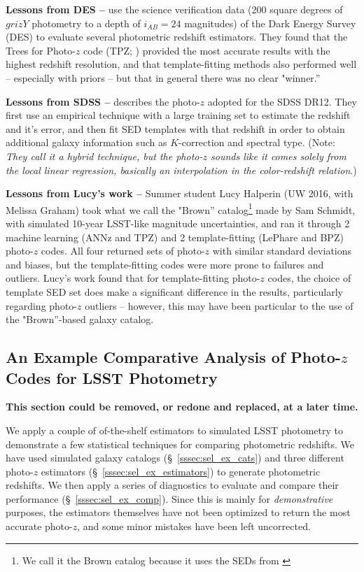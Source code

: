 \documentclass[DM,lsstdraft,toc]{lsstdoc}
\begin{document}
\textbf{Lessons from DES --} \cite{2014MNRAS.445.1482S} use the science verification data (200 square degrees of $grizY$ photometry to a depth of $i_{AB}=24$ magnitudes) of the Dark Energy Survey (DES) to evaluate several photometric redshift estimators. They found that the Trees for Photo-$z$ code (TPZ; \citealt{2013ascl.soft04011C}) provided the most accurate results with the highest redshift resolution, and that template-fitting methods also performed well -- especially with priors -- but that in general there was no clear "winner.''

\textbf{Lessons from SDSS --} \cite{2016MNRAS.460.1371B} describes the photo-$z$ adopted for the SDSS DR12. They first use an empirical technique with a large training set to estimate the redshift and it's error, and then fit SED templates with that redshift in order to obtain additional galaxy information such as $K$-correction and spectral type. (Note: \textit{They call it a hybrid technique, but the photo-$z$ sounds like it comes solely from the local linear regression, basically an interpolation in the color-redshift relation}.)

\textbf{Lessons from Lucy's work --} Summer student Lucy Halperin (UW 2016, with Melissa Graham) took what we call the "Brown'' catalog\footnote{We call it the Brown catalog because it uses the SEDs from \cite{2014ApJS..212...18B}} made by Sam Schmidt, with simulated 10-year LSST-like magnitude uncertainties, and ran it through 2 machine learning (ANNz and TPZ) and 2 template-fitting (LePhare and BPZ) photo-$z$ codes. All four returned sets of photo-$z$ with similar standard deviations and biases, but the template-fitting codes were more prone to failures and outliers. Lucy's work found that for template-fitting photo-$z$ codes, the choice of template SED set does make a significant difference in the results, particularly regarding photo-$z$ outliers -- however, this may have been particular to the use of the "Brown''-based galaxy catalog.


\clearpage
\subsection{An Example Comparative Analysis of Photo-$z$ Codes for LSST Photometry}\label{ssec:sel_ex}

{\bf This section could be removed, or redone and replaced, at a later time.}

We apply a couple of of-the-shelf estimators to simulated LSST photometry to demonstrate a few statistical techniques for comparing photometric redshifts.
We have used simulated galaxy catalogs (\S~\ref{sssec:sel_ex_cats}) and three different photo-$z$ estimators (\S~\ref{sssec:sel_ex_estimators}) to generate photometric redshifts. 
We then apply a series of diagnostics to evaluate and compare their performance (\S~\ref{sssec:sel_ex_comp}).
Since this is mainly for {\it demonstrative} purposes, the estimators themselves have not been optimized to return the most accurate photo-$z$, and some minor mistakes have been left uncorrected.
\end{document}

